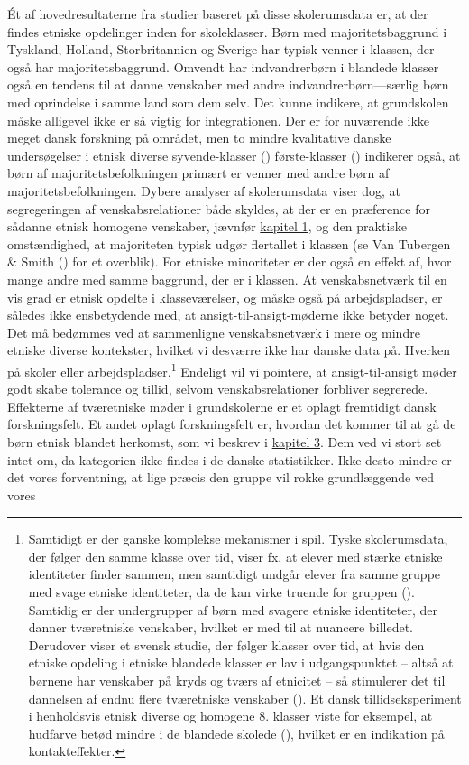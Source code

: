 \documentclass[
]{book}
\begin{document}
Ét af hovedresultaterne fra studier baseret på disse skolerumsdata er, at der findes etniske opdelinger inden for skoleklasser. Børn med majoritetsbaggrund i Tyskland, Holland, Storbritannien og Sverige har typisk venner i klassen, der også har majoritetsbaggrund. Omvendt har indvandrerbørn i blandede klasser også en tendens til at danne venskaber med andre indvandrerbørn---særlig børn med oprindelse i samme land som dem selv. Det kunne indikere, at grundskolen måske alligevel ikke er så vigtig for integrationen. Der er for nuværende ikke meget dansk forskning på området, men to mindre kvalitative danske undersøgelser i etnisk diverse syvende-klasser () første-klasser () indikerer også, at børn af majoritetsbefolkningen primært er venner med andre børn af majoritetsbefolkningen. Dybere analyser af skolerumsdata viser dog, at segregeringen af venskabsrelationer både skyldes, at der er en præference for sådanne etnisk homogene venskaber, jævnfør \hyperref[kap1]{kapitel 1}, og den praktiske omstændighed, at majoriteten typisk udgør flertallet i klassen (se Van Tubergen \& Smith () for et overblik). For etniske minoriteter er der også en effekt af, hvor mange andre med samme baggrund, der er i klassen. At venskabsnetværk til en vis grad er etnisk opdelte i klasseværelser, og måske også på arbejdspladser, er således ikke ensbetydende med, at ansigt-til-ansigt-møderne ikke betyder noget. Det må bedømmes ved at sammenligne venskabsnetværk i mere og mindre etniske diverse kontekster, hvilket vi desværre ikke har danske data på. Hverken på skoler eller arbejdspladser.\footnote{Samtidigt er der ganske komplekse mekanismer i spil. Tyske skolerumsdata, der følger den samme klasse over tid, viser fx, at elever med stærke etniske identiteter finder sammen, men samtidigt undgår elever fra samme gruppe med svage etniske identiteter, da de kan virke truende for gruppen (). Samtidig er der undergrupper af børn med svagere etniske identiteter, der danner tværetniske venskaber, hvilket er med til at nuancere billedet. Derudover viser et svensk studie, der følger klasser over tid, at hvis den etniske opdeling i etniske blandede klasser er lav i udgangspunktet -- altså at børnene har venskaber på kryds og tværs af etnicitet -- så stimulerer det til dannelsen af endnu flere tværetniske venskaber (). Et dansk tillidseksperiment i henholdsvis etnisk diverse og homogene 8. klasser viste for eksempel, at hudfarve betød mindre i de blandede skolede (), hvilket er en indikation på kontakteffekter.} Endeligt vil vi pointere, at ansigt-til-ansigt møder godt skabe tolerance og tillid, selvom venskabsrelationer forbliver segrerede. Effekterne af tværetniske møder i grundskolerne er et oplagt fremtidigt dansk forskningsfelt. Et andet oplagt forskningsfelt er, hvordan det kommer til at gå de børn etnisk blandet herkomst, som vi beskrev i \hyperref[kap3]{kapitel 3}. Dem ved vi stort set intet om, da kategorien ikke findes i de danske statistikker. Ikke desto mindre er det vores forventning, at lige præcis den gruppe vil rokke grundlæggende ved vores 
\end{document}
